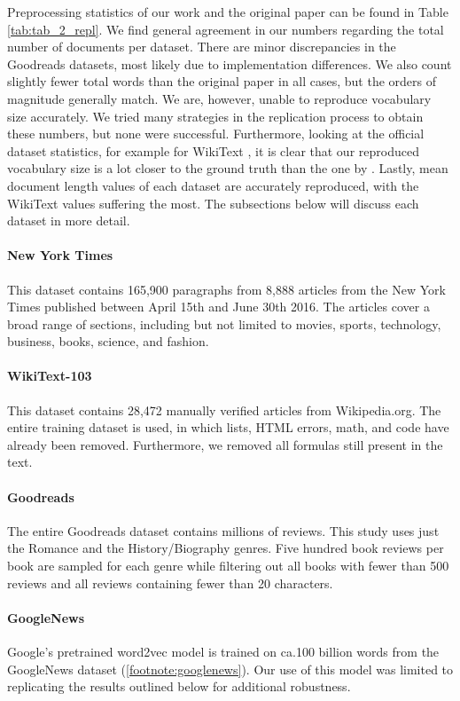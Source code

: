 Preprocessing statistics of our work and the original paper can be found in Table
\ref{tab:tab_2_repl}. We find general agreement in our numbers regarding the total number of
documents per dataset. There are minor discrepancies in the Goodreads datasets, most likely due to
implementation differences. We also count slightly fewer total words than the original paper in all
cases, but the orders of magnitude generally match. We are, however, unable to reproduce vocabulary
size accurately. We tried many strategies in the replication process to obtain these numbers, but
none were successful. Furthermore, looking at the official dataset statistics, for example for
WikiText \citep{DBLP:journals/corr/MerityXBS16}, it is clear that our reproduced vocabulary size is
a lot closer to the ground truth than the one by \citet{antoniak-mimno-2021-bad}. Lastly, mean
document length values of each dataset are accurately reproduced, with the WikiText values suffering
the most. The subsections below will discuss each dataset in more detail.

\paragraph{New York Times} This dataset contains 165,900 paragraphs from 8,888 articles from the New
York Times published between April 15th and June 30th 2016. The articles cover a broad range of
sections, including but not limited to movies, sports, technology, business, books, science, and
fashion.

\paragraph{WikiText-103} This dataset contains 28,472 manually verified articles from Wikipedia.org.
The entire training dataset is used, in which lists, HTML errors, math, and code have already been
removed. Furthermore, we removed all formulas still present in the text.

\paragraph{Goodreads} The entire Goodreads dataset contains millions of reviews. This study uses
just the Romance and the History/Biography genres. Five hundred book reviews per book are sampled
for each genre while filtering out all books with fewer than 500 reviews and all reviews containing
fewer than 20 characters.

\paragraph{GoogleNews} Google's pretrained word2vec model is trained on ca.100 billion words from
the GoogleNews dataset (\ref{footnote:googlenews}). Our use of this model was limited to replicating
the results outlined below for additional robustness.

